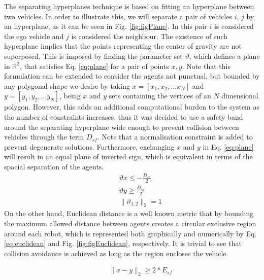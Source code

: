 \documentclass[a4paper,fleqn]{cas-sc}
\begin{document}
    The separating hyperplanes technique is based on fitting an hyperplane between two vehicles. In order to illustrate this, we will separate a pair of vehicles $i$, $j$ by an hyperplane, as it can be seen in Fig. \ref{fig:figPlane}. In this pair $i$ is considered the ego vehicle and $j$ is considered the neighbour. The existence of such hyperplane implies that the points representing the center of gravity are not superposed.  This is imposed by finding the parameter set $\vartheta$, which defines a plane in $\mathbb{R}^2$, that satisfies Eq. \eqref{eq:plane} for a pair of points $x,y$. Note that this formulation can be extended to consider the agents not punctual, but bounded by any polygonal shape we desire by taking $x = [x_1,x_2, ... x_N]$ and $y = [y_1,y_2, ... y_N]$, being $x$ and $y$ sets containing the vertices of an $N$ dimensional polygon. However, this adds an additional computational burden to the system as the number of constraints increases, thus it was decided to use a safety band around the separating hyperplane wide enough to prevent collision between vehicles through the term $D_{sf}$. Note that a normalisation constraint is added to prevent degenerate solutions. Furthermore, exchanging $x$ and $y$ in Eq. \eqref{eq:plane} will result in an equal plane of inverted sign, which is equivalent in terms of the spacial separation of the agents.\\ 
    \begin{equation}
        \begin{aligned}
            \label{eq:plane}
            &&& \vartheta x \leq -\frac{D_{sf}}{2} \\
            &&& \vartheta y \geq \frac{D_{sf}}{2} \\
            &&& \lVert \vartheta_{1,2} \rVert_2 = 1 
    \end{aligned}
    \end{equation}
    On the other hand, Euclidean distance is a well known metric that by bounding the maximum allowed distance between agents creates a circular exclusive region around each robot, which is represented both graphically and numerically by Eq. \eqref{eq:euclidean} and Fig. \ref{fig:figEuclidean}, respectively. It is trivial to see that collision avoidance is achieved as long as the region encloses the vehicle. 
    
    \begin{equation}
        \begin{aligned}
            \label{eq:euclidean}
            &&& \lVert x - y \rVert_2 \geq 2*E_{sf} \\
        \end{aligned}
    \end{equation}
\end{document}
